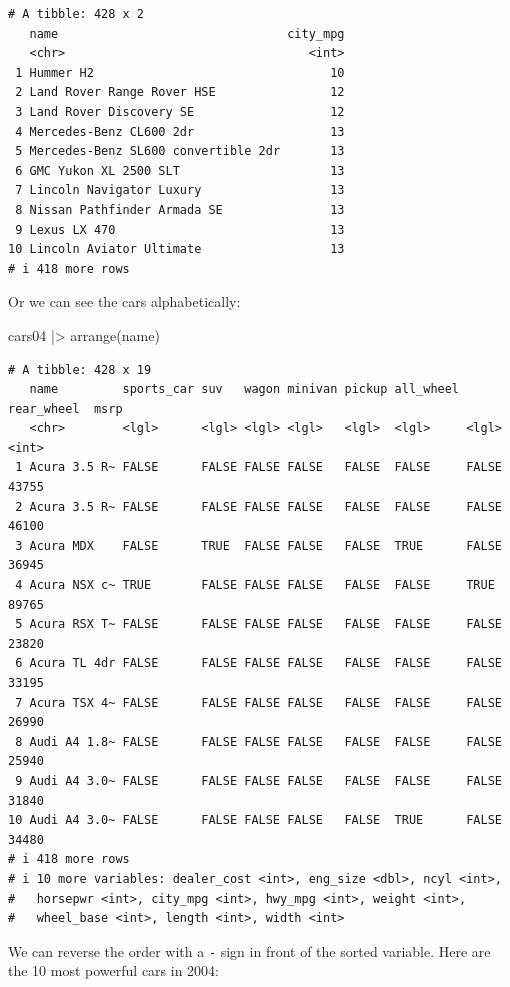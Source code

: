 \documentclass[
  letterpaper,
]{book}
\newenvironment{Shaded}{\begin{snugshade}}{\end{snugshade}}
\newcommand{\FunctionTok}[1]{\textcolor[rgb]{0.28,0.35,0.67}{#1}}
\newcommand{\NormalTok}[1]{\textcolor[rgb]{0.00,0.23,0.31}{#1}}
\newcommand{\SpecialCharTok}[1]{\textcolor[rgb]{0.37,0.37,0.37}{#1}}
\begin{document}
\begin{verbatim}
# A tibble: 428 x 2
   name                                city_mpg
   <chr>                                  <int>
 1 Hummer H2                                 10
 2 Land Rover Range Rover HSE                12
 3 Land Rover Discovery SE                   12
 4 Mercedes-Benz CL600 2dr                   13
 5 Mercedes-Benz SL600 convertible 2dr       13
 6 GMC Yukon XL 2500 SLT                     13
 7 Lincoln Navigator Luxury                  13
 8 Nissan Pathfinder Armada SE               13
 9 Lexus LX 470                              13
10 Lincoln Aviator Ultimate                  13
# i 418 more rows
\end{verbatim}

Or we can see the cars alphabetically:

\begin{Shaded}
\begin{Highlighting}[]
\NormalTok{cars04 }\SpecialCharTok{|\textgreater{}} 
  \FunctionTok{arrange}\NormalTok{(name) }
\end{Highlighting}
\end{Shaded}

\begin{verbatim}
# A tibble: 428 x 19
   name         sports_car suv   wagon minivan pickup all_wheel rear_wheel  msrp
   <chr>        <lgl>      <lgl> <lgl> <lgl>   <lgl>  <lgl>     <lgl>      <int>
 1 Acura 3.5 R~ FALSE      FALSE FALSE FALSE   FALSE  FALSE     FALSE      43755
 2 Acura 3.5 R~ FALSE      FALSE FALSE FALSE   FALSE  FALSE     FALSE      46100
 3 Acura MDX    FALSE      TRUE  FALSE FALSE   FALSE  TRUE      FALSE      36945
 4 Acura NSX c~ TRUE       FALSE FALSE FALSE   FALSE  FALSE     TRUE       89765
 5 Acura RSX T~ FALSE      FALSE FALSE FALSE   FALSE  FALSE     FALSE      23820
 6 Acura TL 4dr FALSE      FALSE FALSE FALSE   FALSE  FALSE     FALSE      33195
 7 Acura TSX 4~ FALSE      FALSE FALSE FALSE   FALSE  FALSE     FALSE      26990
 8 Audi A4 1.8~ FALSE      FALSE FALSE FALSE   FALSE  FALSE     FALSE      25940
 9 Audi A4 3.0~ FALSE      FALSE FALSE FALSE   FALSE  FALSE     FALSE      31840
10 Audi A4 3.0~ FALSE      FALSE FALSE FALSE   FALSE  TRUE      FALSE      34480
# i 418 more rows
# i 10 more variables: dealer_cost <int>, eng_size <dbl>, ncyl <int>,
#   horsepwr <int>, city_mpg <int>, hwy_mpg <int>, weight <int>,
#   wheel_base <int>, length <int>, width <int>
\end{verbatim}

We can reverse the order with a \texttt{-} sign in front of the sorted
variable. Here are the 10 most powerful cars in 2004:
\end{document}
